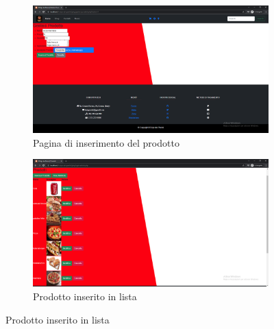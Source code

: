\documentclass[a4paper,12pt]{report}
\begin{document}
	\begin{figure}[H]
		\begin{subfigure}{.6\textwidth}
			\centering
			\includegraphics[width=1\linewidth]{./Images/Admin_inserimento.png}
			\caption{Pagina di inserimento del prodotto}
			\label{fig:inserimento1}
		\end{subfigure}
		\begin{subfigure}{.6\textwidth}
			\centering
			\includegraphics[width=1\linewidth]{./Images/Admin_inserimento2.png}
			\caption{Prodotto inserito in lista}
			\label{fig:inserimento2}
		\end{subfigure}
		\label{fig:inserimenti}
	\end{figure}
\end{document}
